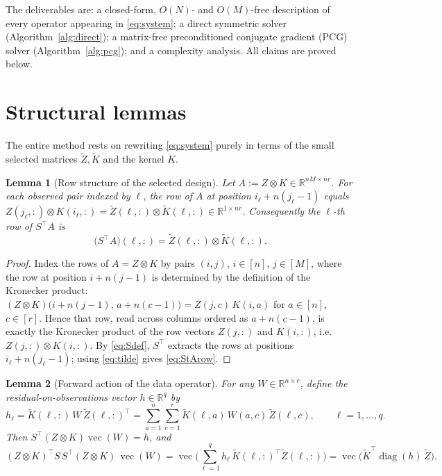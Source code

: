 \documentclass[12pt]{article}
\DeclareMathOperator{\vecop}{vec}
\DeclareMathOperator{\diag}{diag}
\newcommand{\bR}{\mathbb{R}}
\newcommand{\tZ}{\tilde Z}
\newcommand{\tK}{\tilde K}
\newtheorem{lemma}{Lemma}
\theoremstyle{definition}
\begin{document}
The deliverables are: a closed-form, $O(N)$- and $O(M)$-free description of every
operator appearing in \eqref{eq:system}; a direct symmetric solver
(Algorithm~\ref{alg:direct}); a matrix-free preconditioned conjugate gradient
(PCG) solver (Algorithm~\ref{alg:pcg}); and a complexity analysis. All claims are
proved below.

\section{Structural lemmas}

The entire method rests on rewriting \eqref{eq:system} purely in terms of the
small selected matrices $\tZ,\tK$ and the kernel $K$.

\begin{lemma}[Row structure of the selected design]\label{lem:rows}
Let $A:=Z\otimes K\in\bR^{nM\times nr}$. For each observed pair indexed by $\ell$,
the row of $A$ at position $i_\ell+n(j_\ell-1)$ equals
$Z(j_\ell,:)\otimes K(i_\ell,:)=\tZ(\ell,:)\otimes\tK(\ell,:)\in\bR^{1\times nr}$.
Consequently the $\ell$-th row of $S^\top A$ is
\begin{equation}\label{eq:StArow}
\big(S^\top A\big)(\ell,:)=\tZ(\ell,:)\otimes\tK(\ell,:).
\end{equation}
\end{lemma}

\begin{proof}
Index the rows of $A=Z\otimes K$ by pairs $(i,j)$, $i\in[n]$, $j\in[M]$, where the
row at position $i+n(j-1)$ is determined by the definition of the Kronecker
product: $(Z\otimes K)\big(i+n(j-1),\,a+n(c-1)\big)=Z(j,c)\,K(i,a)$ for
$a\in[n]$, $c\in[r]$. Hence that row, read across columns ordered as
$a+n(c-1)$, is exactly the Kronecker product of the row vectors $Z(j,:)$ and
$K(i,:)$, i.e.\ $Z(j,:)\otimes K(i,:)$. By \eqref{eq:Sdef}, $S^\top$ extracts the
rows at positions $i_\ell+n(j_\ell-1)$; using \eqref{eq:tilde} gives
\eqref{eq:StArow}.
\end{proof}

\begin{lemma}[Forward action of the data operator]\label{lem:fwd}
For any $W\in\bR^{n\times r}$, define the residual-on-observations vector
$h\in\bR^q$ by
\begin{equation}\label{eq:hl}
h_\ell=\tK(\ell,:)\,W\,\tZ(\ell,:)^\top=\sum_{a=1}^n\sum_{c=1}^r
\tK(\ell,a)\,W(a,c)\,\tZ(\ell,c),\qquad \ell=1,\dots,q.
\end{equation}
Then $S^\top(Z\otimes K)\vecop(W)=h$, and
\begin{equation}\label{eq:datamv}
(Z\otimes K)^\top S\,S^\top(Z\otimes K)\,\vecop(W)
=\vecop\!\Big(\textstyle\sum_{\ell=1}^q h_\ell\,\tK(\ell,:)^\top\tZ(\ell,:)\Big)
=\vecop\!\big(\tK^\top\diag(h)\,\tZ\big).
\end{equation}
\end{lemma}
\end{document}
